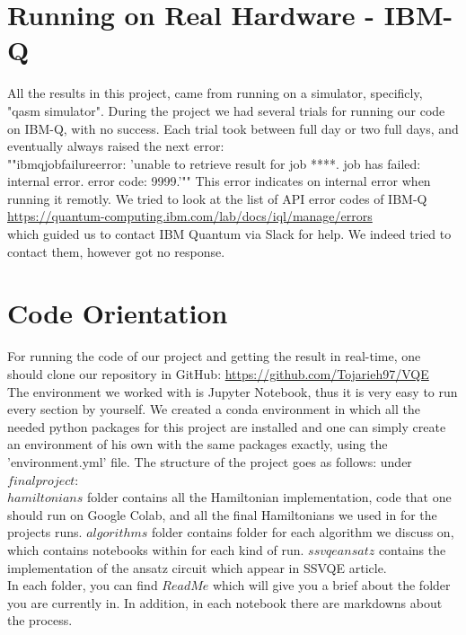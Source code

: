 \documentclass[12pt, a4paper]{article}
\begin{document}
    \section{Running on Real Hardware - IBM-Q}
    All the results in this project, came from running on a simulator, specificly, "qasm simulator". During the project we had several trials for running our code on IBM-Q, with no success. Each trial took between full day or two full days, and eventually always raised the next error:\\
    ""ibmqjobfailureerror: 'unable to retrieve result for job ****. job has failed: internal error. error code: 9999.'"" This error indicates on internal error when running it remotly. We tried to look at the list of API error codes of IBM-Q\\ \url{https://quantum-computing.ibm.com/lab/docs/iql/manage/errors}\\
    which guided us to contact IBM Quantum via Slack for help. We indeed tried to contact them, however got no response.


    \section{Code Orientation}
    For running the code of our project and getting the result in real-time, one should clone our repository in GitHub:
    \url{https://github.com/Tojarieh97/VQE}\\
    The environment we worked with is Jupyter Notebook, thus it is very easy to run every section by yourself.
    We created a conda environment in which all the needed python packages for this project are installed and one can simply create an environment of his own with the same packages exactly, using the 'environment.yml' file.
    The structure of the project goes as follows:
    under $final project$:\\
    $hamiltonians$ folder contains all the Hamiltonian implementation, code that one should run on Google Colab, and all the final Hamiltonians we used in for the projects runs.
    $algorithms$ folder contains folder for each algorithm we discuss on, which contains notebooks within for each kind of run.
    $ssvqe ansatz$ contains the implementation of the ansatz circuit which appear in SSVQE article.
    \\ In each folder, you can find $ReadMe$ which will give you a brief about the folder you are currently in. In addition, in each notebook there are markdowns about the process.
\end{document}

